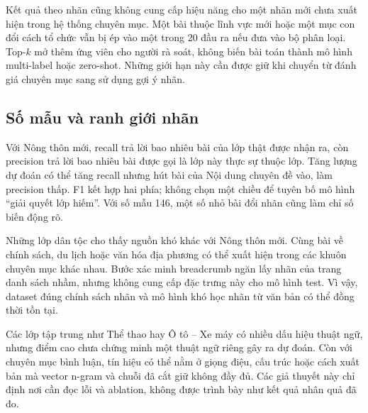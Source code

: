 Kết quả theo nhãn cũng không cung cấp hiệu năng cho một nhãn mới chưa xuất hiện trong hệ thống chuyên mục. Một bài thuộc lĩnh vực mới hoặc một mục con đổi cách tổ chức vẫn bị ép vào một trong 20 đầu ra nếu đưa vào bộ phân loại. Top-$k$ mở thêm ứng viên cho người rà soát, không biến bài toán thành mô hình multi-label hoặc zero-shot. Những giới hạn này cần được giữ khi chuyển từ đánh giá chuyên mục sang sử dụng gợi ý nhãn.


\subsection{Số mẫu và ranh giới nhãn}
Với Nông thôn mới, recall trả lời bao nhiêu bài của lớp thật được nhận ra, còn precision trả lời bao nhiêu bài được gọi là lớp này thực sự thuộc lớp. Tăng lượng dự đoán có thể tăng recall nhưng hút bài của Nội dung chuyên đề vào, làm precision thấp. F1 kết hợp hai phía; không chọn một chiều để tuyên bố mô hình ``giải quyết lớp hiếm''. Với số mẫu 146, một số nhỏ bài đổi nhãn cũng làm chỉ số biến động rõ.

Những lớp dân tộc cho thấy nguồn khó khác với Nông thôn mới. Cùng bài về chính sách, du lịch hoặc văn hóa địa phương có thể xuất hiện trong các khuôn chuyên mục khác nhau. Bước xác minh breadcrumb ngăn lấy nhãn của trang danh sách nhầm, nhưng không cung cấp đặc trưng này cho mô hình test. Vì vậy, dataset đúng chính sách nhãn và mô hình khó học nhãn từ văn bản có thể đồng thời tồn tại.

Các lớp tập trung như Thể thao hay Ô tô -- Xe máy có nhiều dấu hiệu thuật ngữ, nhưng điểm cao chưa chứng minh một thuật ngữ riêng gây ra dự đoán. Còn với chuyên mục bình luận, tín hiệu có thể nằm ở giọng điệu, cấu trúc hoặc cách xuất bản mà vector n-gram và chuỗi đã cắt giữ không đầy đủ. Các giả thuyết này chỉ định nơi cần đọc lỗi và ablation, không được trình bày như kết quả nhân quả đã đo.

\FloatBarrier
